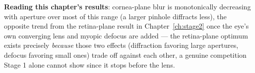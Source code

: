 

\textbf{Reading this chapter's results}: cornea-plane blur is monotonically decreasing
with aperture over most of this range (a larger pinhole diffracts less), the opposite
trend from the retina-plane result in Chapter~\ref{ch:stage2} once the eye's own
converging lens and myopic defocus are added --- the retina-plane optimum exists
precisely \emph{because} those two effects (diffraction favoring large apertures,
defocus favoring small ones) trade off against each other, a genuine competition Stage
1 alone cannot show since it stops before the lens.
